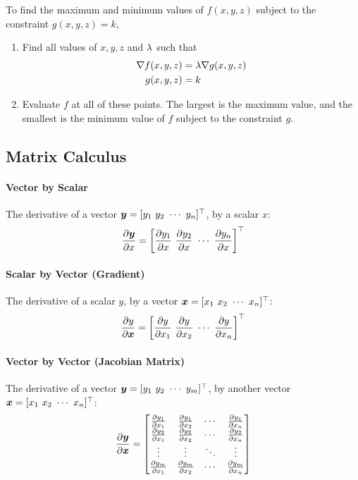 To find the maximum and minimum values of $f(x,y,z)$ subject to the constraint $g(x,y,z)=k$,
\begin{enumerate}
	\item Find all values of $x,y,z$ and $\lambda$ such that
	\begin{align*}
		\nabla f(x,y,z)&=\lambda\nabla g(x,y,z) \\
		g(x,y,z)&=k
	\end{align*}
	\item Evaluate $f$ at all of these points. The largest is the maximum value, and the smallest is the minimum value of $f$ subject to the constraint $g$.
\end{enumerate}

\subsection{Matrix Calculus}

\paragraph{Vector by Scalar}

The derivative of a vector $\vec{y}=[y_1\ y_2\ \cdots\ y_n]\T$, by a scalar $x$:
\begin{align*}
	\frac{\partial\boldsymbol{y}}{\partial x}=\left[\frac{\partial y_1}{\partial x}\ \frac{\partial y_2}{\partial x}\ \cdots\ \frac{\partial y_n}{\partial x}\right]^\top
\end{align*}

\paragraph{Scalar by Vector (Gradient)}

The derivative of a scalar $y$, by a vector $\vec{x}=[x_1\ x_2\ \cdots\ x_n]\T$:
\begin{align*}
	\frac{\partial y}{\partial\boldsymbol{x}}=\left[\frac{\partial y}{\partial x_1}\ \frac{\partial y}{\partial x_2}\ \cdots\ \frac{\partial y}{\partial x_n}\right]^\top
\end{align*}

\paragraph{Vector by Vector (Jacobian Matrix)}

The derivative of a vector $\vec{y}=[y_1\ y_2\ \cdots\ y_m]\T$, by another vector $\vec{x}=[x_1\ x_2\ \cdots\ x_n]\T$:
\begin{align*}
	\frac{\partial\boldsymbol{y}}{\partial\boldsymbol{x}}=\begin{bmatrix}
		\frac{\partial y_1}{\partial x_1}&\frac{\partial y_1}{\partial x_2}&\cdots&\frac{\partial y_1}{\partial x_n} \\
		\frac{\partial y_2}{\partial x_1}&\frac{\partial y_2}{\partial x_2}&\cdots&\frac{\partial y_2}{\partial x_n} \\
		\vdots&\vdots&\ddots&\vdots \\
		\frac{\partial y_m}{\partial x_1}&\frac{\partial y_m}{\partial x_2}&\cdots&\frac{\partial y_m}{\partial x_n}
	\end{bmatrix}
\end{align*}


